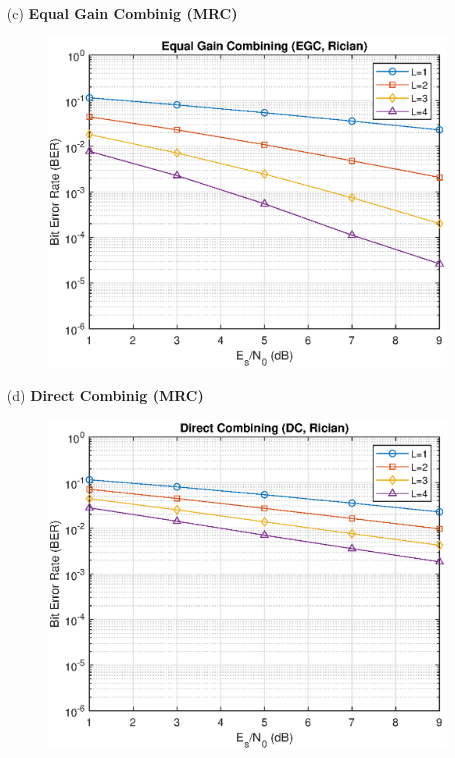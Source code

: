 \begin{itemize}
\begin{figure}[H]
    \end{figure}
    \item[(c)] \textbf{Equal Gain Combinig (MRC)} \hfill \\
    \begin{figure}[H]
        \centering
        \includegraphics[scale = 0.85]{EGC_rician.eps}
    \end{figure}
    \item[(d)] \textbf{Direct Combinig (MRC)} \hfill \\
    \begin{figure}[H]
        \centering
        \includegraphics[scale = 0.85]{DC_rician.eps}
    \end{figure}
\end{itemize}